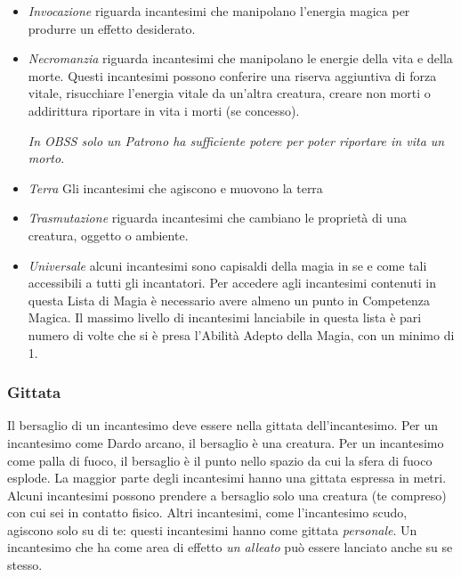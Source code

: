 \begin{multicols}{2}
\begin{itemize}[leftmargin=*]
\item
\emph{Invocazione} riguarda incantesimi che manipolano l'energia magica per produrre un effetto desiderato.

\item
\emph{Necromanzia} riguarda incantesimi che manipolano le energie della vita e della morte. Questi incantesimi possono conferire una riserva aggiuntiva di forza vitale, risucchiare l'energia vitale da un'altra creatura, creare non morti o addirittura riportare in vita i morti (se concesso).

\emph{In OBSS solo un Patrono ha sufficiente potere per poter riportare in vita un morto}.

\item
\emph{Terra} Gli incantesimi che agiscono e muovono la terra

\item
\emph{Trasmutazione} riguarda incantesimi che cambiano le proprietà di una creatura, oggetto o ambiente.

\item
\emph{Universale} alcuni incantesimi sono capisaldi della magia in se e come tali accessibili a tutti gli incantatori. Per accedere agli incantesimi contenuti in questa Lista di Magia è necessario avere almeno un punto in Competenza Magica. Il massimo livello di incantesimi lanciabile in questa lista è pari numero di volte che si è presa l'Abilità Adepto della Magia, con un minimo di 1.

\end{itemize}

\subsubsection{Gittata}\label{magiegittata}

Il bersaglio di un incantesimo deve essere nella gittata dell'incantesimo. Per un incantesimo come Dardo arcano, il bersaglio è una creatura. Per un incantesimo come palla di fuoco, il bersaglio è il punto nello spazio da cui la sfera di fuoco esplode. La maggior parte degli incantesimi hanno una gittata espressa in metri. Alcuni incantesimi possono prendere a bersaglio solo una creatura (te compreso) con cui sei in contatto fisico. Altri incantesimi, come l'incantesimo scudo, agiscono solo su di te: questi incantesimi hanno come gittata \emph{personale}. Un incantesimo che ha come area di effetto \emph{un alleato} può essere lanciato anche su se stesso.


\end{multicols}
